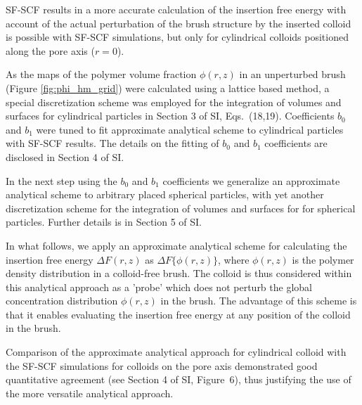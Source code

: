 \documentclass[12pt, a4paper]{article}
\begin{document}
SF-SCF results in a more accurate calculation of the insertion free energy with account of the actual perturbation of the brush structure by the inserted colloid is possible with SF-SCF simulations, but only for cylindrical colloids positioned along the pore axis ($r=0$).

As the maps of the polymer volume fraction $\phi(r,z)$ in an unperturbed brush (Figure \ref{fig:phi_hm_grid}) were calculated using a lattice based method, a special discretization scheme was employed for the integration of volumes and surfaces for cylindrical particles in
Section 3 of SI, Eqs.~(18,19).
Coefficients $b_0$ and $b_1$ were tuned to fit approximate analytical scheme to cylindrical particles with SF-SCF results.
The details on the fitting of $b_0$ and $b_1$ coefficients are disclosed in Section 4 of SI.

In the next step using the $b_0$ and $b_1$ coefficients we generalize an approximate analytical scheme to arbitrary placed spherical particles, with yet another discretization scheme for the integration of volumes and surfaces for for spherical particles.
Further details is in Section 5 of SI.

In what follows, we apply an approximate analytical scheme for calculating the insertion free energy $\Delta F(r,z)$ as $\Delta F\{\phi(r,z)\}$, 
where $\phi(r,z)$ is the polymer density distribution in a colloid-free brush. 
The colloid is thus considered within this analytical approach as a 'probe' which does not perturb the global concentration distribution $\phi(r,z)$ in the brush. 
The advantage of this scheme is that it enables evaluating the insertion free energy at any position of the colloid in the brush.

Comparison of the approximate analytical approach for cylindrical colloid with the SF-SCF simulations for colloids on the pore axis demonstrated good quantitative agreement (see Section 4 of SI, Figure~6), 
thus justifying the use of the more versatile analytical approach.
\end{document}
